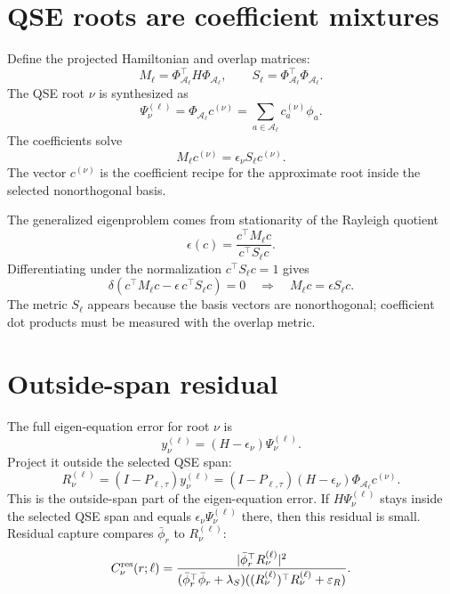 \documentclass[10pt,twocolumn]{article}
\newcommand{\eps}{\varepsilon}
\begin{document}
\section{QSE roots are coefficient mixtures}

Define the projected Hamiltonian and overlap matrices:
\begin{equation}
M_\ell=\Phi_{\mathcal A_\ell}^\top H\Phi_{\mathcal A_\ell},
\qquad
S_\ell=\Phi_{\mathcal A_\ell}^\top\Phi_{\mathcal A_\ell}.
\label{eq:p3_MS}
\end{equation}
The QSE root \(\nu\) is synthesized as
\begin{equation}
\Psi_\nu^{(\ell)}=\Phi_{\mathcal A_\ell}c^{(\nu)}
=\sum_{a\in\mathcal A_\ell}c_a^{(\nu)}\phi_a.
\label{eq:p3_root}
\end{equation}
The coefficients solve
\begin{equation}
\boxed{M_\ell c^{(\nu)}=\epsilon_\nu S_\ell c^{(\nu)}.}
\label{eq:p3_gep}
\end{equation}
The vector \(c^{(\nu)}\) is the coefficient recipe for the approximate root inside the selected nonorthogonal basis.

The generalized eigenproblem comes from stationarity of the Rayleigh quotient
\begin{equation}
\epsilon(c)=\frac{c^\top M_\ell c}{c^\top S_\ell c}.
\label{eq:p3_rayleigh}
\end{equation}
Differentiating under the normalization \(c^\top S_\ell c=1\) gives
\begin{equation}
\delta\left(c^\top M_\ell c-\epsilon\,c^\top S_\ell c\right)=0
\quad\Longrightarrow\quad
M_\ell c=\epsilon S_\ell c.
\label{eq:p3_gep_derivation}
\end{equation}
The metric \(S_\ell\) appears because the basis vectors are nonorthogonal; coefficient dot products must be measured with the overlap metric.

\section{Outside-span residual}

The full eigen-equation error for root \(\nu\) is
\begin{equation}
y_\nu^{(\ell)}=(H-\epsilon_\nu)\Psi_\nu^{(\ell)}.
\label{eq:p3_y}
\end{equation}
Project it outside the selected QSE span:
\begin{equation}
R_\nu^{(\ell)}=(I-P_{\ell,\tau})y_\nu^{(\ell)}
=(I-P_{\ell,\tau})(H-\epsilon_\nu)\Phi_{\mathcal A_\ell}c^{(\nu)}.
\label{eq:p3_residual}
\end{equation}
This is the outside-span part of the eigen-equation error. If \(H\Psi_\nu^{(\ell)}\) stays inside the selected QSE span and equals \(\epsilon_\nu\Psi_\nu^{(\ell)}\) there, then this residual is small.
Residual capture compares \(\bar\phi_r\) to \(R_\nu^{(\ell)}\):
\begin{equation}
C_\nu^{\rm res}(r;\ell)
=
\frac{|\bar\phi_r^\top R_\nu^{(\ell)}|^2}
{(\bar\phi_r^\top\bar\phi_r+\lambda_S)((R_\nu^{(\ell)})^\top R_\nu^{(\ell)}+\eps_R)}.
\label{eq:p3_res_capture}
\end{equation}
\end{document}
